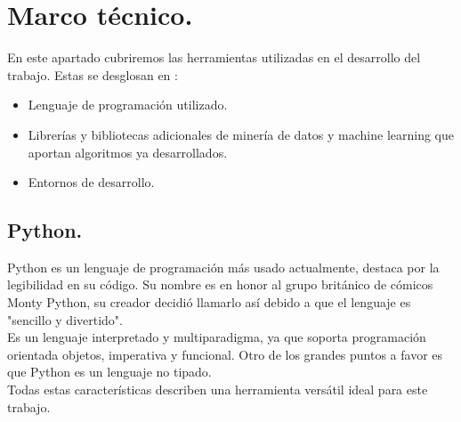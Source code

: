 \documentclass[a4paper,10pt]{article}
\begin{document}
\section{Marco técnico.}
En este apartado cubriremos las herramientas utilizadas en el desarrollo del trabajo. Estas se desglosan en :
\begin{itemize}
\item Lenguaje de programación utilizado.
\item Librerías y bibliotecas adicionales de minería de datos y machine learning que aportan algoritmos ya desarrollados.
\item Entornos  de desarrollo.
\end{itemize}
\subsection{Python.}
Python es un lenguaje de programación	más usado actualmente, destaca por la legibilidad en su código. Su nombre es en honor al grupo británico de cómicos Monty Python, su creador decidió llamarlo así debido a que el lenguaje es "sencillo y divertido".\\
Es un lenguaje interpretado y  multiparadigma, ya que soporta programación orientada objetos, imperativa y funcional. Otro de los grandes puntos a favor es que Python es un lenguaje no tipado.\\
Todas estas características describen una herramienta versátil ideal para este trabajo. 
\end{document}
